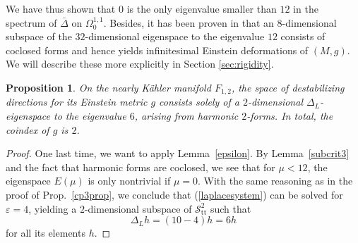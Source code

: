\documentclass[12pt]{scrartcl}
\theoremstyle{plain}
\newtheorem{prop}[satz]{Proposition}
\theoremstyle{definition}
\renewcommand{\S}{\mathscr{S}}%
\newcommand{\TT}{\S^2_{\mathrm{tt}}}%
\begin{document}
We have thus shown that $0$ is the only eigenvalue smaller than $12$ in the spectrum of $\bar\Delta$ on $\Omega^{1,1}_0$. Besides, it has been proven in \cite[Sec.~6]{hermitianlaplace} that an $8$-dimensional subspace of the $32$-dimensional eigenspace to the eigenvalue $12$ consists of coclosed forms and hence yields infinitesimal Einstein deformations of $(M,g)$. We will describe these more explicitly in Section \ref{sec:rigidity}.

\begin{prop}
  On the nearly Kähler manifold $F_{1,2}$, the space of destabilizing directions for its Einstein metric $g$ consists solely of a $2$-dimensional $\Delta_L$-eigenspace to the eigenvalue $6$, arising from harmonic $2$-forms. In total, the coindex of $g$ is $2$.
\end{prop}
\begin{proof}
One last time, we want to apply Lemma~\ref{epsilon}. By Lemma~\ref{subcrit3} and the fact that harmonic forms are coclosed, we see that for $\mu<12$, the eigenspace $E(\mu)$ is only nontrivial if $\mu=0$. With the same reasoning as in the proof of Prop.~\ref{cp3prop}, we conclude that (\ref{laplacesystem}) can be solved for $\varepsilon=4$, yielding a $2$-dimensional subspace of $\TT$ such that
\[\Delta_Lh=(10-4)h=6h\]
for all its elements $h$.
\end{proof}
\end{document}
